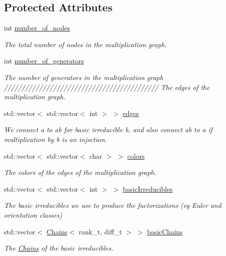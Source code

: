 \subsection*{Protected Attributes}
\begin{DoxyCompactItemize}
\item 
int \hyperlink{classMackey_1_1MultiplicationTable_a224de8ffa6d10b7d9511880bb8a2260f}{number\+\_\+of\+\_\+nodes}
\begin{DoxyCompactList}\small\item\em The total number of nodes in the multiplication graph. \end{DoxyCompactList}\item 
int \hyperlink{classMackey_1_1MultiplicationTable_aa964329ee1c5b9072146567d2bd6567f}{number\+\_\+of\+\_\+generators}
\begin{DoxyCompactList}\small\item\em The number of generators in the multiplication graph //////////////////////////////////////////// The edges of the multiplication graph. \end{DoxyCompactList}\item 
std\+::vector$<$ std\+::vector$<$ int $>$ $>$ \hyperlink{classMackey_1_1MultiplicationTable_a3e1f526da86649b8a41465d27395d04b}{edges}
\begin{DoxyCompactList}\small\item\em We connect a to ab for basic irreducible b, and also connect ab to a if multiplication by b is an injection. \end{DoxyCompactList}\item 
std\+::vector$<$ std\+::vector$<$ char $>$ $>$ \hyperlink{classMackey_1_1MultiplicationTable_a11dcad2d104dfd310c8d3439fa00a4ce}{colors}
\begin{DoxyCompactList}\small\item\em The colors of the edges of the multiplication graph. \end{DoxyCompactList}\item 
std\+::vector$<$ std\+::vector$<$ int $>$ $>$ \hyperlink{classMackey_1_1MultiplicationTable_af6896ea01c087e71533de423d7cf65ac}{basic\+Irreducibles}
\begin{DoxyCompactList}\small\item\em The basic irreducibles we use to produce the factorizations (eg Euler and orientation classes) \end{DoxyCompactList}\item 
std\+::vector$<$ \hyperlink{classMackey_1_1Chains}{Chains}$<$ rank\+\_\+t, diff\+\_\+t $>$ $>$ \hyperlink{classMackey_1_1MultiplicationTable_ad135c8e904a71919c96437b444f4b1bb}{basic\+Chains}
\begin{DoxyCompactList}\small\item\em The \hyperlink{classMackey_1_1Chains}{Chains} of the basic irreducibles. \end{DoxyCompactList}\end{DoxyCompactItemize}


